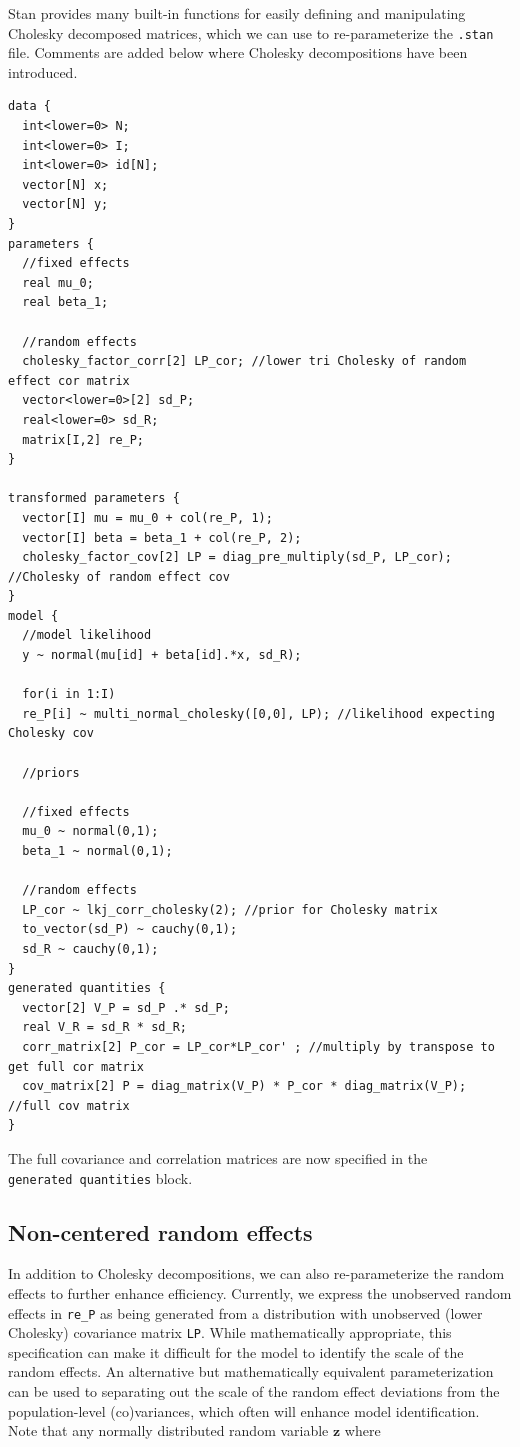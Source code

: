 \documentclass[
]{book}
\begin{document}
Stan provides many built-in functions for easily defining and manipulating Cholesky decomposed matrices, which we can use to re-parameterize the \texttt{.stan} file. Comments are added below where Cholesky decompositions have been introduced.

\begin{verbatim}
data {
  int<lower=0> N; 
  int<lower=0> I; 
  int<lower=0> id[N]; 
  vector[N] x; 
  vector[N] y;
}
parameters {
  //fixed effects
  real mu_0;
  real beta_1;
  
  //random effects
  cholesky_factor_corr[2] LP_cor; //lower tri Cholesky of random effect cor matrix 
  vector<lower=0>[2] sd_P;
  real<lower=0> sd_R;
  matrix[I,2] re_P;
}

transformed parameters {
  vector[I] mu = mu_0 + col(re_P, 1);
  vector[I] beta = beta_1 + col(re_P, 2);
  cholesky_factor_cov[2] LP = diag_pre_multiply(sd_P, LP_cor); //Cholesky of random effect cov
}
model {
  //model likelihood
  y ~ normal(mu[id] + beta[id].*x, sd_R);
  
  for(i in 1:I)
  re_P[i] ~ multi_normal_cholesky([0,0], LP); //likelihood expecting Cholesky cov
  
  //priors
  
  //fixed effects
  mu_0 ~ normal(0,1);
  beta_1 ~ normal(0,1);
  
  //random effects
  LP_cor ~ lkj_corr_cholesky(2); //prior for Cholesky matrix
  to_vector(sd_P) ~ cauchy(0,1);
  sd_R ~ cauchy(0,1);
}
generated quantities {
  vector[2] V_P = sd_P .* sd_P;
  real V_R = sd_R * sd_R;
  corr_matrix[2] P_cor = LP_cor*LP_cor' ; //multiply by transpose to get full cor matrix
  cov_matrix[2] P = diag_matrix(V_P) * P_cor * diag_matrix(V_P); //full cov matrix
}
\end{verbatim}

The full covariance and correlation matrices are now specified in the \texttt{generated\ quantities} block.

\hypertarget{non-centered-random-effects}{%
\subsection{Non-centered random effects}\label{non-centered-random-effects}}

In addition to Cholesky decompositions, we can also re-parameterize the random effects to further enhance efficiency. Currently, we express the unobserved random effects in \texttt{re\_P} as being generated from a distribution with unobserved (lower Cholesky) covariance matrix \texttt{LP}. While mathematically appropriate, this specification can make it difficult for the model to identify the scale of the random effects. An alternative but mathematically equivalent parameterization can be used to separating out the scale of the random effect deviations from the population-level (co)variances, which often will enhance model identification. Note that any normally distributed random variable \(\boldsymbol{z}\) where
\end{document}
